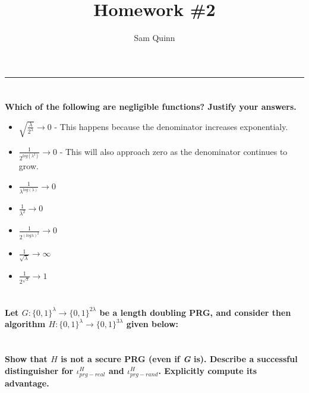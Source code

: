 \documentclass[letterpaper,12pt,notitlepage,fleqn]{article}
\title{Homework \#2}
\author{Sam Quinn}
\begin{document}
\maketitle
\hrule

\section{}
\textbf{Which of the following are negligible functions? Justify your answers.}
\begin{itemize}
	\item $\sqrt{\frac{\lambda}{2^{\lambda}}} \rightarrow 0$ - This happens because the denominator increases exponentialy.
	\item $\frac{1}{2^{log(\lambda^{2})}} \rightarrow 0$ - This will also approach zero as the denominator continues to grow.
	\item $\frac{1}{\lambda^{log(\lambda)}} \rightarrow 0$
	\item $\frac{1}{\lambda^{2}} \rightarrow 0$
	\item $\frac{1}{2^{(log\lambda)^{2}}} \rightarrow 0$
	\item $\frac{1}{\sqrt{\lambda}} \rightarrow \infty$
	\item $\frac{1}{2^{\sqrt{\lambda}}} \rightarrow 1$
\end{itemize}
\section{}
\textbf{Let $G:\lbrace0,1\rbrace^{\lambda} \rightarrow \lbrace0,1\rbrace^{2\lambda}$ be a length doubling PRG, and consider then algorithm $H:\lbrace0,1\rbrace^{\lambda} \rightarrow \lbrace0,1\rbrace^{3\lambda}$ given below:}
\begin{center}
\begin{multicols}{2}
\columnbreak
\end{multicols}
\end{center}
\section{}
\textbf{Show that $H$ is \textbf{not} a secure PRG (even if \textit{G} is). Describe a successful distinguisher for $\iota^{H}_{prg-real}$ and $\iota^{H}_{prg-rand}$. Explicitly compute its advantage.}
\begin{center}
\begin{multicols}{2}
\columnbreak
\end{multicols}
\end{center}
\end{document}
